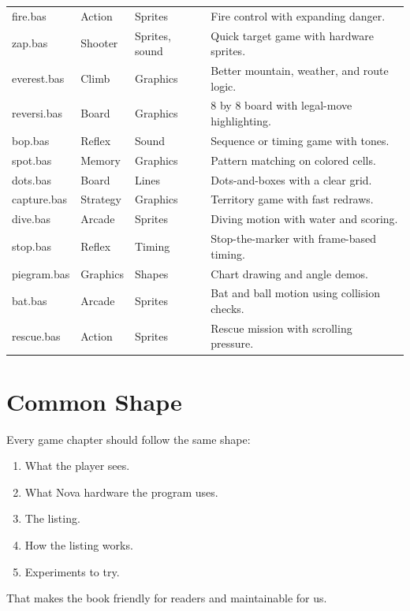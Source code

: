 \begin{longtable}{>{\ttfamily}p{}p{}p{}p{}}
fire.bas & Action & Sprites & Fire control with expanding danger.\\
zap.bas & Shooter & Sprites, sound & Quick target game with hardware sprites.\\
everest.bas & Climb & Graphics & Better mountain, weather, and route logic.\\
reversi.bas & Board & Graphics & 8 by 8 board with legal-move highlighting.\\
bop.bas & Reflex & Sound & Sequence or timing game with tones.\\
spot.bas & Memory & Graphics & Pattern matching on colored cells.\\
dots.bas & Board & Lines & Dots-and-boxes with a clear grid.\\
capture.bas & Strategy & Graphics & Territory game with fast redraws.\\
dive.bas & Arcade & Sprites & Diving motion with water and scoring.\\
stop.bas & Reflex & Timing & Stop-the-marker with frame-based timing.\\
piegram.bas & Graphics & Shapes & Chart drawing and angle demos.\\
bat.bas & Arcade & Sprites & Bat and ball motion using collision checks.\\
rescue.bas & Action & Sprites & Rescue mission with scrolling pressure.\\
\bottomrule
\end{longtable}

\section{Common Shape}

Every game chapter should follow the same shape:

\begin{enumerate}
\item What the player sees.
\item What Nova hardware the program uses.
\item The listing.
\item How the listing works.
\item Experiments to try.
\end{enumerate}

That makes the book friendly for readers and maintainable for us.
